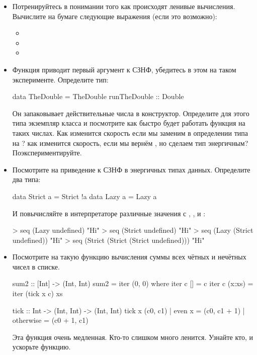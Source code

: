 \begin{itemize}
\item
  Потренируйтесь в понимании того как происходят ленивые вычисления.
  Вычислите на бумаге следующие выражения (если это возможно):

  \begin{itemize}
  \item
  \item
  \item
  \end{itemize}
\item
  Функция  приводит первый аргумент к СЗНФ, убедитесь в этом на
  таком эксперименте. Определите тип:


  \begin{code}
  data TheDouble = TheDouble { runTheDouble :: Double }
  \end{code}

  Он запаковывает действительные числа в конструктор. Определите для
  этого типа экземпляр класса  и посмотрите как быстро будет
  работать функция  на таких числах. Как изменится скорость
  если мы заменим в определении типа  на ? как
  изменится скорость, если мы вернём , но сделаем тип
   энергичным? Поэкспериментируйте.
\item
  Посмотрите на приведение к СЗНФ в энергичных типах данных. Определите
  два типа:


  \begin{code}
  data Strict a = Strict !a
  data Lazy   a = Lazy    a
  \end{code}

  И повычисляйте в интерпретаторе различные значения с ,
  , \In{($!)} и :


  \begin{code}
  > seq (Lazy undefined) "Hi"
  > seq (Strict undefined) "Hi"
  > seq (Lazy (Strict undefined)) "Hi"
  > seq (Strict (Strict (Strict undefined))) "Hi"
  \end{code}
\item
  Посмотрите на такую функцию вычисления суммы всех чётных и нечётных
  чисел в списке.


  \begin{code}
  sum2 :: [Int] -> (Int, Int)
  sum2 = iter (0, 0)
      where iter c  []     = c
            iter c  (x:xs) = iter (tick x c) xs

  tick :: Int -> (Int, Int) -> (Int, Int)
  tick x (c0, c1) | even x    = (c0, c1 + 1)
                  | otherwise = (c0 + 1, c1)
  \end{code}

  Эта функция очень медленная. Кто-то слишком много ленится. Узнайте
  кто, и ускорьте функцию.
\end{itemize}
